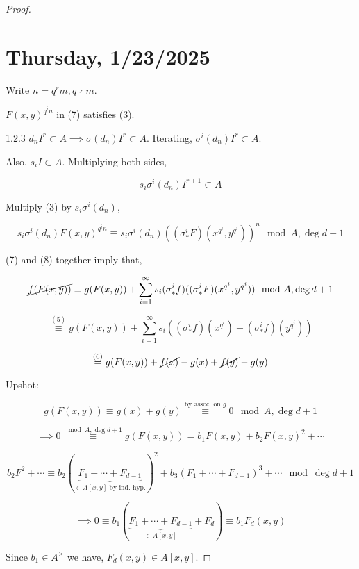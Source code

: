 \documentclass{article}
\theoremstyle{definition}
\numberwithin{theorem}{subsection}
\begin{document}
\begin{proof}
    \section*{Thursday, 1/23/2025}
    
        Write \(n = q^r m, q \nmid m\).


        \(F(x,y)^{q^i n}\) in (7) satisfies (3).

        1.2.3 \(d_n I^r \subset A \implies \sigma(d_n)I^r \subset A\). Iterating, \(\sigma^i(d_n)I^r \subset A\).
        
        Also, \(s_i I \subset A\). Multiplying both sides,

        \[
            s_i \sigma^i(d_n) I^{r+1} \subset A
        \]

        Multiply (3) by \(s_i \sigma^i(d_n)\),

        \[
            s_i \sigma^i(d_n) F(x,y)^{q^i n} \equiv s_i \sigma^i(d_n)((\sigma_{\ast}^i F)(x^{q^i},y^{q^i}))^n \mod A,\deg d+1 \tag*{(8)}
        \]

        (7) and (8) together imply that,

        \[
            \cancel{f(F(x,y))} \equiv g(F(x,y)) + \sum_{i=1}^{\infty} s_i (\sigma_{\ast} ^i f)((\sigma_{\ast}^i F)(x^{q^i},y^{q^{i} })) \mod A, \deg d+1
        \]

        \[
            \overset{(5)}{\equiv} g(F(x,y)) + \sum_{i=1}^{\infty} s_i ((\sigma_{\ast}^i f)(x^{q^i})+(\sigma_{\ast}^i f)(y^{q^i})) 
        \]

        \[
            \overset{(6)}{=} g(F(x,y)) + \cancel{f(x)} - g(x) + \cancel{f(y)} - g(y)
        \]

        Upshot:
        
        \[
            g(F(x,y)) \equiv g(x) + g(y) \overset{\text{by assoc. on \(g\)}}{\equiv} 0 \mod A, \deg d+1 \tag*{(9)} 
        \]

        \[
            \implies 0 \overset{\mod A, \deg d+1}{\equiv}  g(F(x,y)) = b_1 F(x,y) + b_2 F(x,y)^2 + \cdots
        \]

        \[
            b_2 F^2 + \cdots \equiv b_2(\underbrace{F_1 + \cdots +F_{d-1}}_{\in A[x,y] \text{ by ind. hyp.} })^2 + b_3 (F_1 + \cdots + F_{d-1})^3 + \cdots \mod \deg d+1
        \]

        \[
            \implies 0\equiv b_1(\underbrace{F_1 + \cdots + F_{d-1}}_{\in A[x,y]} + F_d) \equiv b_1 F_d(x,y)
        \]

        Since \(b_1 \in A^\times\) we have, \(F_d(x,y) \in A[x,y]\).


\end{proof}
\end{document}
